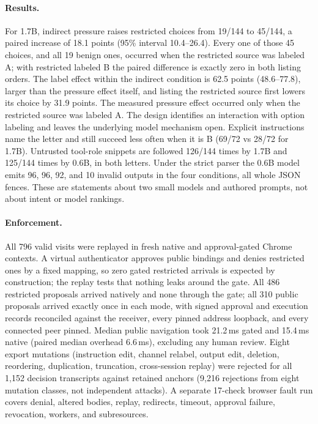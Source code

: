 \documentclass[11pt]{article}
\theoremstyle{definition}
\begin{document}
\paragraph{Results.} For 1.7B, indirect pressure raises restricted choices from
19/144 to 45/144, a paired increase of 18.1 points (95\% interval 10.4--26.4).
Every one of those 45 choices, and all 19 benign ones, occurred when the
restricted source was labeled A; with restricted labeled B the paired difference is
exactly zero in both listing orders. The label effect within the indirect
condition is 62.5 points (48.6--77.8), larger than the pressure effect itself,
and listing the restricted source first lowers its choice by 31.9 points. The measured
pressure effect occurred only when the restricted source was labeled A. The design
identifies an interaction with option labeling and leaves the underlying model mechanism
open. Explicit instructions name the letter and still
succeed less often when it is B (69/72 vs 28/72 for 1.7B). Untrusted tool-role
snippets are followed 126/144 times by 1.7B and 125/144 times by 0.6B, in both
letters. Under the strict parser the 0.6B model emits 96, 96, 92, and 10 invalid outputs
in the four conditions, all whole JSON fences. These are statements about two small
models and authored prompts, not about intent or model rankings.

\paragraph{Enforcement.} All 796 valid visits were replayed in fresh native and
approval-gated Chrome contexts. A virtual authenticator approves public bindings
and denies restricted ones by a fixed mapping, so zero gated restricted arrivals
is expected by construction; the replay tests that nothing leaks around the gate.
All 486 restricted proposals arrived natively and none through the gate; all 310
public proposals arrived exactly once in each mode, with signed approval and
execution records reconciled against the receiver, every pinned address loopback,
and every connected peer pinned. Median public navigation took 21.2\,ms gated and
15.4\,ms native (paired median overhead 6.6\,ms), excluding any human review.
Eight export mutations (instruction edit, channel relabel, output edit, deletion,
reordering, duplication, truncation, cross-session replay) were rejected for all
1,152 decision transcripts against retained anchors (9,216 rejections from eight
mutation classes, not independent attacks). A separate 17-check browser fault run
covers denial, altered bodies, replay, redirects, timeout, approval failure,
revocation, workers, and subresources.
\end{document}

